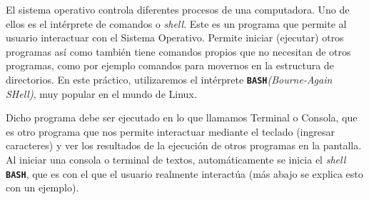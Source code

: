 \documentclass[12pt]{article}
\newcommand{\bash}{\textbf{\texttt{BASH}}}
\begin{document}
El sistema operativo controla diferentes procesos de una computadora. Uno de
ellos es el intérprete de comandos o \emph{shell}. Este es un programa que
permite al usuario interactuar con el Sistema Operativo. Permite iniciar
(ejecutar) otros programas así como también tiene comandos propios que no
necesitan de otros programas, como por ejemplo comandos para movernos en la
estructura de directorios. En este práctico, utilizaremos el intérprete
\bash\emph{(Bourne-Again SHell)}, muy popular en el mundo de Linux.

Dicho programa debe ser ejecutado en lo que llamamos Terminal o Consola, que
es otro programa que nos permite interactuar mediante el teclado (ingresar
caracteres) y ver los resultados de la ejecución de otros programas en la
pantalla. Al iniciar una consola o terminal de textos, automáticamente se
inicia el \emph{shell} \bash, que es con el que el usuario realmente
interactúa (más abajo se explica esto con un ejemplo).
\end{document}
